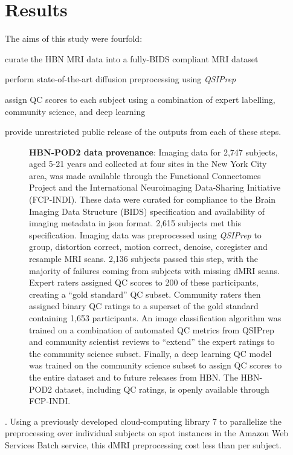 \documentclass[fleqn,10pt]{wlscirep}
\begin{document}
\section*{Results}

The aims of this study were fourfold:
\begin{enumerate*}[%
    label=(\roman*),%
    before=\unskip{: },%
    itemjoin={{, }},%
    itemjoin*={{, and }}]
    \item curate the HBN MRI data into a fully-BIDS compliant MRI dataset
    \item perform state-of-the-art diffusion preprocessing using \emph{QSIPrep}
    \item assign QC scores to each subject using a combination of expert labelling, community science, and deep learning
    \item provide unrestricted public release of the outputs from each of these steps.
\end{enumerate*}

\begin{figure}[ht]
    \centering
    \caption{%
        {\bf HBN-POD2 data provenance}:
        Imaging data for 2,747 subjects, aged 5-21 years and collected at four
        sites in the New York City area, was made available through the
        Functional Connectomes Project and the International Neuroimaging
        Data-Sharing Initiative (FCP-INDI).
        These data were curated for compliance to the Brain Imaging Data
        Structure (BIDS) specification \cite{gorgolewski2016-lh} and
        availability of imaging metadata in json format. 2,615 subjects met this
        specification.
        Imaging data was preprocessed using \emph{QSIPrep} \cite{cieslak2021-iq}
        to group, distortion correct, motion correct, denoise, coregister and
        resample MRI scans. 2,136 subjects passed this step, with the majority
        of failures coming from subjects with missing dMRI scans.
        Expert raters assigned QC scores to 200 of these participants, creating
        a ``gold standard'' QC subset. Community raters then assigned binary QC
        ratings to a superset of the gold standard containing 1,653
        participants. An image classification algorithm was trained on a
        combination of automated QC metrics from QSIPrep and community scientist
        reviews to ``extend'' the expert ratings to the community science
        subset.  Finally, a deep learning QC model was trained on the community
        science subset to assign QC scores to the entire dataset and to future
        releases from HBN.
        The HBN-POD2 dataset, including QC ratings, is openly available through
        FCP-INDI.
    }
    \label{fig:stream}
\end{figure}
. Using a previously developed cloud-computing library 7 to parallelize the preprocessing over individual subjects on spot instances in the Amazon Web Services Batch service, this dMRI preprocessing cost less than  per subject.
\end{document}
